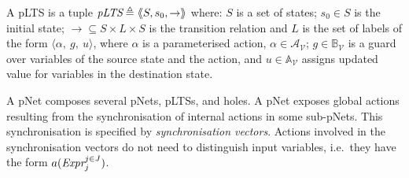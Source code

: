 \documentclass{llncs}
\newcommand{\Simon}{\\\hfill\mdash Simon}
\newcommand{\noteSB}[2][color=green!40, size=\tiny]{\todo[#1]{{#2}\Simon}}
\newcommand{\Ludo}{\\\hfill\mdash Ludo}
\newcommand{\noteLH}[2][color=orange!40, size=\tiny]{\todo[#1]{{#2}\Ludo}}
\newcommand{\cA}{\ensuremath{\mathcal{A}}}
\newcommand{\sA}{\ensuremath{\mathbb{A}}}
\newcommand{\sB}{\ensuremath{\mathbb{B}}}
\newcommand{\cV}{\ensuremath{\mathcal{V}}}
\newcommand{\mdash}[1][]{---#1}
\newcommand{\ie}[1][\ ]{i.e.#1}
\newcommand{\variables}{\ensuremath{\cV}}
\newcommand{\actions}[1]{\ensuremath{\cA_{#1}}}
\newcommand{\boolexprs}[1]{\ensuremath{\sB_{#1}}}
\newcommand{\assigns}[1]{\ensuremath{\sA_{#1}}}
\begin{document}
\begin{definition}[pLTS]
\label{pLTS}
A pLTS is a tuple
$\pLTS\triangleq\mylangle S,s_0, \to\myrangle$ where:
$S$ is a set of states; %
$s_0 \in S$ is the initial state;
$\to \subseteq S \times L \times S$ is the transition relation and 
$L$ is the set of labels of the form
$\langle \alpha,~g,~u\rangle$,
where $\alpha$ is a parameterised action, $\alpha \in\actions{\variables}$; 
$g\in\boolexprs{\variables}$ is a guard over variables of the source state and the 
action, and $u\in\assigns{\variables}$
assigns updated value for variables in the destination state. 
\end{definition}
A pNet composes several pNets, pLTSs, and holes.
A  pNet  exposes
 global actions resulting from the synchronisation of internal actions in some sub-pNets. 
This synchronisation  is specified by  \emph{synchronisation vectors}.
Actions involved in the synchronisation vectors do
not need to distinguish input variables, \ie they 
have the form $a(\Expr_j^{j \in J})$.
\end{document}
